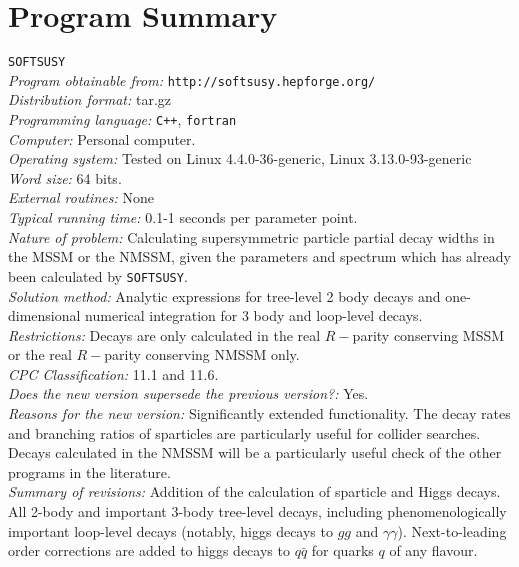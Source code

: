 \documentclass[final,3p,times,pdflatex]{elsarticle}
\def\SOFTSUSY{{\tt SOFTSUSY}}
\begin{document}
\section{Program Summary}
 \SOFTSUSY{} \\
{\em Program obtainable   from:} {\tt http://softsusy.hepforge.org/} \\
{\em Distribution format:}\/ tar.gz \\
{\em Programming language:} {\tt C++}, {\tt fortran} \\
{\em Computer:}\/ Personal computer. \\
{\em Operating system:}\/ Tested on Linux 4.4.0-36-generic, Linux 3.13.0-93-generic
\\
{\em Word size:}\/ 64 bits. \\
{\em External routines:}\/ None \\
{\em Typical running time:}\/ 0.1-1 seconds per parameter point. \\
{\em Nature of problem:}\/ Calculating supersymmetric particle partial decay
widths in the 
MSSM or the NMSSM\@, given the parameters and spectrum which has already been
calculated by \SOFTSUSY{}. \\
{\em Solution method:}\/ Analytic expressions for tree-level 2 body decays and
one-dimensional numerical integration for 3 body and loop-level decays.\\
{\em Restrictions:} Decays are only calculated in the real $R-$parity conserving
MSSM  or the real $R-$parity conserving
NMSSM only. \\
{\em CPC Classification:}\/ 11.1 and 11.6. \\
{\em Does the new version supersede the previous version?:}\/ Yes. \\
{\em Reasons for the new version:}\/ Significantly extended functionality. The
decay rates and branching ratios of sparticles are particularly useful for
collider searches. Decays calculated in the NMSSM will be a particularly
useful check of the other programs in the literature.\\
{\em Summary of revisions:}\/
Addition of the calculation of sparticle and Higgs decays. 
All 2-body and important 3-body tree-level
decays, including phenomenologically important loop-level decays (notably,
higgs decays to $gg$ and $\gamma \gamma$). Next-to-leading order corrections
are added to higgs 
decays to $q \bar q$ for quarks $q$ of any flavour.
\end{document}
